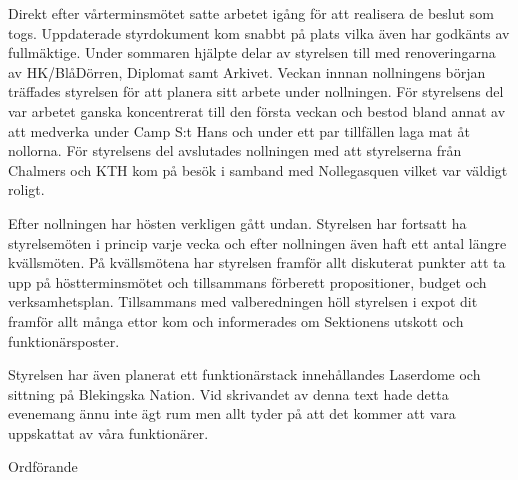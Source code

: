 \documentclass[../_main/handlingar.tex]{subfiles}
\begin{document}

Direkt efter vårterminsmötet satte arbetet igång för att realisera de beslut som togs. Uppdaterade styrdokument kom snabbt på plats vilka även har godkänts av fullmäktige. Under sommaren hjälpte delar av styrelsen till med renoveringarna av HK/BlåDörren, Diplomat samt Arkivet. Veckan innnan nollningens början träffades styrelsen för att planera sitt arbete under nollningen. För styrelsens del var arbetet ganska koncentrerat till den första veckan och bestod bland annat av att medverka under Camp S:t Hans och under ett par tillfällen laga mat åt nollorna. För styrelsens del avslutades nollningen med att styrelserna från Chalmers och KTH kom på besök i samband med Nollegasquen vilket var väldigt roligt.

Efter nollningen har hösten verkligen gått undan. Styrelsen har fortsatt ha styrelsemöten i princip varje vecka och efter nollningen även haft ett antal längre kvällsmöten. På kvällsmötena har styrelsen framför allt diskuterat punkter att ta upp på höstterminsmötet och tillsammans förberett propositioner, budget och verksamhetsplan. Tillsammans med valberedningen höll styrelsen i expot dit framför allt många ettor kom och informerades om Sektionens utskott och funktionärsposter.

Styrelsen har även planerat ett funktionärstack innehållandes Laserdome och sittning på Blekingska Nation. Vid skrivandet av denna text hade detta evenemang ännu inte ägt rum men allt tyder på att det kommer att vara uppskattat av våra funktionärer.

\begin{signatures}{1}
    \mvh
    \signature{\ordf}{Ordförande}
\end{signatures}
\end{document}
